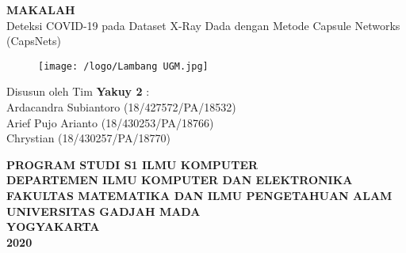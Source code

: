 \documentclass{article}
\begin{document}
  \begin{titlepage}
    \begin{center}
      
      \null
      {
      \huge \bfseries MAKALAH}\\
      [1cm]
      {\LARGE Deteksi COVID-19 pada Dataset X-Ray Dada dengan Metode Capsule Networks (CapsNets)}\\
          
      \vspace{2cm}

      \begin{figure}[H]
        \centering
        \texttt{[image: /logo/Lambang UGM.jpg]}
      \end{figure}
          
      \vspace{3cm}
    
      {\Large 
      Disusun oleh Tim \bfseries Yakuy 2} {\Large :\\
      \vspace{0.5cm}
      Ardacandra Subiantoro (18/427572/PA/18532)\\
      Arief Pujo Arianto (18/430253/PA/18766)\\
      Chrystian (18/430257/PA/18770)\\
      }


      \vspace{2cm}

      {\normalsize \bfseries
      PROGRAM STUDI S1 ILMU KOMPUTER\\
      DEPARTEMEN ILMU KOMPUTER DAN ELEKTRONIKA\\
      FAKULTAS MATEMATIKA DAN ILMU PENGETAHUAN ALAM\\
      UNIVERSITAS GADJAH MADA\\
      YOGYAKARTA\\
      \vspace{0.2cm}
      2020
      }
            
    \end{center}
  \end{titlepage}


  \newpage
  \tableofcontents
  \newpage
\end{document}
